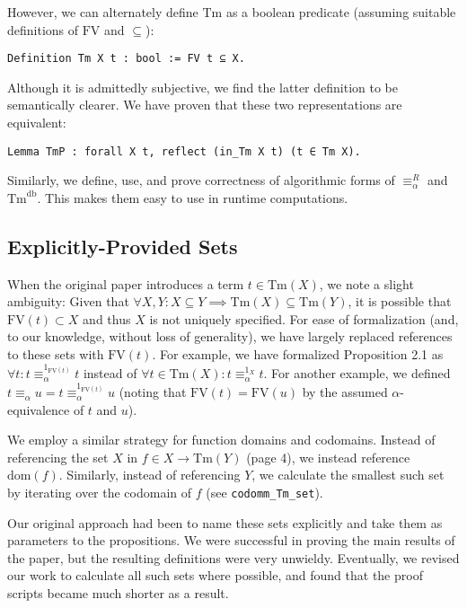 \documentclass{article}
\begin{document}
However, we can alternately define $\textrm{Tm}$ as a boolean predicate (assuming suitable
definitions of $\textrm{FV}$ and $\subseteq$):

\begin{verbatim}
Definition Tm X t : bool := FV t ⊆ X.
\end{verbatim}

Although it is admittedly subjective, we find the latter definition to be semantically clearer. We
have proven that these two representations are equivalent:

\begin{verbatim}
Lemma TmP : forall X t, reflect (in_Tm X t) (t ∈ Tm X).
\end{verbatim}

Similarly, we define, use, and prove correctness of algorithmic forms of $\equiv_\alpha^R$ and
$\textrm{Tm}^{\textrm{db}}$. This makes them easy to use in runtime computations.

\subsection{Explicitly-Provided Sets}

When the original paper introduces a term $t \in \textrm{Tm}(X)$, we note a slight ambiguity: Given
that $\forall X, Y : X \subseteq Y \implies \textrm{Tm}(X) \subseteq \textrm{Tm}(Y)$, it is possible
that $\textrm{FV}(t) \subset X$ and thus $X$ is not uniquely specified. For ease of formalization
(and, to our knowledge, without loss of generality), we have largely replaced references to these
sets with $\textrm{FV}(t)$. For example, we have formalized Proposition 2.1 as $\forall t : t
\equiv_\alpha^{1_{\textrm{FV}(t)}} t$ instead of $\forall t \in \textrm{Tm}(X) : t
\equiv_\alpha^{1_X} t$. For another example, we defined $t \equiv_\alpha u = t
\equiv_\alpha^{1_{\textrm{FV}(t)}} u$ (noting that $\textrm{FV}(t) = \textrm{FV}(u)$ by the assumed
$\alpha$-equivalence of $t$ and $u$).

We employ a similar strategy for function domains and codomains. Instead of referencing the set $X$
in $f \in X \longrightarrow \textrm{Tm}(Y)$ (page 4), we instead reference $\textrm{dom}(f)$.
Similarly, instead of referencing $Y$, we calculate the smallest such set by iterating over
the codomain of $f$ (see \verb|codomm_Tm_set|).

Our original approach had been to name these sets explicitly and take them as parameters to the
propositions. We were successful in proving the main results of the paper, but the resulting
definitions were very unwieldy. Eventually, we revised our work to calculate all such sets where
possible, and found that the proof scripts became much shorter as a result.
\end{document}
